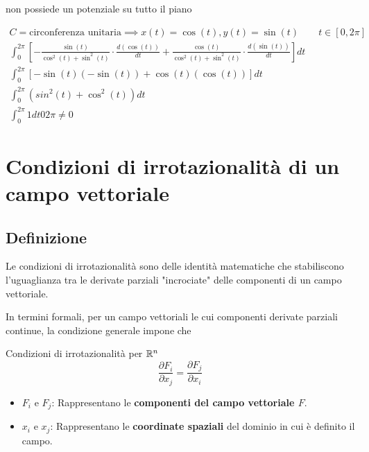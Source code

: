 non possiede un potenziale su tutto il piano

\begin{gather}
    C = \text{circonferenza unitaria} \implies x(t) = \cos(t), y(t)= \sin(t) \qquad t \in [0,2\pi] \\
    \int^{2\pi}_{0}[- \frac{\sin(t)}{\cos^2(t)+\sin^2(t)} \cdot \frac{d(\cos(t))}{dt}+ \frac{\cos(t)}{\cos^2(t)+\sin^2(t)} \cdot \frac{d(\sin(t))}{dt}] dt \\
    \int^{2\pi}_{0}[-\sin(t)(-\sin(t)) + \cos(t)(\cos(t))]dt \\
    \int^{2\pi}_{0}(sin^2(t) + \cos^2(t)) dt \\
    \int^{2\pi}_{0} 1dt 0 2\pi \not = 0
\end{gather}

\section{Condizioni di irrotazionalità di un campo vettoriale}
\subsection{Definizione}
Le condizioni di irrotazionalità sono delle identità matematiche che stabiliscono l'uguaglianza tra le derivate parziali "incrociate" delle componenti di un campo vettoriale.

In termini formali, per un campo vettoriali le cui componenti derivate parziali continue, la condizione generale impone che 

\begin{definizione}{Condizioni di irrotazionalità per $\mathbb{R}^n$}
{\large
    $$
    \frac{\partial F_i}{\partial x_j} = \frac{\partial F_j}{\partial x_i}
    $$
}
\begin{itemize}
    \item $F_{i}$ e $F_{j}$: Rappresentano le \textbf{componenti del campo vettoriale $F$}.
    \item $x_{i}$ e $x_{j}$: Rappresentano le \textbf{coordinate spaziali} del dominio in cui è definito il campo.
\end{itemize}
\end{definizione}

